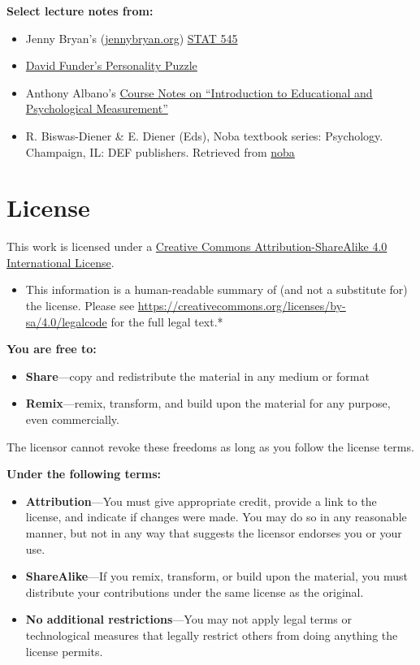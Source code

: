 \textbf{Select lecture notes from:}

\begin{itemize}
\tightlist
\item
  Jenny Bryan's (\href{https://jennybryan.org/}{jennybryan.org}) \href{https://stat545.com/}{STAT 545}
\item
  \href{https://wwnorton.com/books/The-Personality-Puzzle/}{David Funder's Personality Puzzle}
\item
  Anthony Albano's \href{https://www.thetaminusb.com/intro-measurement-r/}{Course Notes on ``Introduction to Educational and Psychological Measurement''}
\item
  R. Biswas-Diener \& E. Diener (Eds), Noba textbook series: Psychology. Champaign, IL: DEF publishers. Retrieved from \href{https://nobaproject.com/}{noba}
\end{itemize}

\hypertarget{license}{%
\chapter*{License}\label{license}}


This work is licensed under a \href{https://creativecommons.org/licenses/by-sa/4.0/}{Creative Commons Attribution-ShareAlike 4.0 International License}.

\begin{itemize}
\tightlist
\item
  This information is a human-readable summary of (and not a substitute for) the license.
  Please see \url{https://creativecommons.org/licenses/by-sa/4.0/legalcode} for the full legal text.*
\end{itemize}

\textbf{You are free to:}

\begin{itemize}
\item
  \textbf{Share}---copy and redistribute the material in any medium or
  format
\item
  \textbf{Remix}---remix, transform, and build upon the material for any
  purpose, even commercially.
\end{itemize}

The licensor cannot revoke these freedoms as long as you follow the
license terms.

\textbf{Under the following terms:}

\begin{itemize}
\item
  \textbf{Attribution}---You must give appropriate credit, provide a link
  to the license, and indicate if changes were made. You may do so in
  any reasonable manner, but not in any way that suggests the licensor
  endorses you or your use.
\item
  \textbf{ShareAlike}---If you remix, transform, or build upon the material, you must distribute your contributions under the same license as the original.
\item
  \textbf{No additional restrictions}---You may not apply legal terms or
  technological measures that legally restrict others from doing
  anything the license permits.
\end{itemize}

